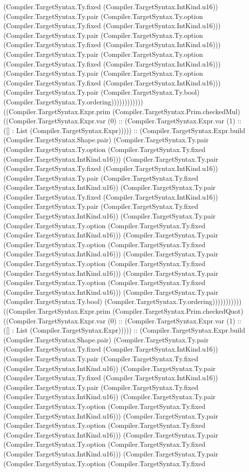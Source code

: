 \documentclass[11pt]{article}
\begin{document}
(Compiler.TargetSyntax.Ty.fixed (Compiler.TargetSyntax.IntKind.u16)) (Compiler.TargetSyntax.Ty.pair (Compiler.TargetSyntax.Ty.option (Compiler.TargetSyntax.Ty.fixed (Compiler.TargetSyntax.IntKind.u16))) (Compiler.TargetSyntax.Ty.pair (Compiler.TargetSyntax.Ty.option (Compiler.TargetSyntax.Ty.fixed (Compiler.TargetSyntax.IntKind.u16))) (Compiler.TargetSyntax.Ty.pair (Compiler.TargetSyntax.Ty.option (Compiler.TargetSyntax.Ty.fixed (Compiler.TargetSyntax.IntKind.u16))) (Compiler.TargetSyntax.Ty.pair (Compiler.TargetSyntax.Ty.option (Compiler.TargetSyntax.Ty.fixed (Compiler.TargetSyntax.IntKind.u16))) (Compiler.TargetSyntax.Ty.pair (Compiler.TargetSyntax.Ty.bool) (Compiler.TargetSyntax.Ty.ordering)))))))))))) ((Compiler.TargetSyntax.Expr.prim (Compiler.TargetSyntax.Prim.checkedMul) ((Compiler.TargetSyntax.Expr.var (0) :: (Compiler.TargetSyntax.Expr.var (1) :: ([] : List (Compiler.TargetSyntax.Expr))))) :: (Compiler.TargetSyntax.Expr.build (Compiler.TargetSyntax.Shape.pair) (Compiler.TargetSyntax.Ty.pair (Compiler.TargetSyntax.Ty.option (Compiler.TargetSyntax.Ty.fixed (Compiler.TargetSyntax.IntKind.u16))) (Compiler.TargetSyntax.Ty.pair (Compiler.TargetSyntax.Ty.fixed (Compiler.TargetSyntax.IntKind.u16)) (Compiler.TargetSyntax.Ty.pair (Compiler.TargetSyntax.Ty.fixed (Compiler.TargetSyntax.IntKind.u16)) (Compiler.TargetSyntax.Ty.pair (Compiler.TargetSyntax.Ty.fixed (Compiler.TargetSyntax.IntKind.u16)) (Compiler.TargetSyntax.Ty.pair (Compiler.TargetSyntax.Ty.fixed (Compiler.TargetSyntax.IntKind.u16)) (Compiler.TargetSyntax.Ty.pair (Compiler.TargetSyntax.Ty.option (Compiler.TargetSyntax.Ty.fixed (Compiler.TargetSyntax.IntKind.u16))) (Compiler.TargetSyntax.Ty.pair (Compiler.TargetSyntax.Ty.option (Compiler.TargetSyntax.Ty.fixed (Compiler.TargetSyntax.IntKind.u16))) (Compiler.TargetSyntax.Ty.pair (Compiler.TargetSyntax.Ty.option (Compiler.TargetSyntax.Ty.fixed (Compiler.TargetSyntax.IntKind.u16))) (Compiler.TargetSyntax.Ty.pair (Compiler.TargetSyntax.Ty.option (Compiler.TargetSyntax.Ty.fixed (Compiler.TargetSyntax.IntKind.u16))) (Compiler.TargetSyntax.Ty.pair (Compiler.TargetSyntax.Ty.bool) (Compiler.TargetSyntax.Ty.ordering))))))))))) ((Compiler.TargetSyntax.Expr.prim (Compiler.TargetSyntax.Prim.checkedQuot) ((Compiler.TargetSyntax.Expr.var (0) :: (Compiler.TargetSyntax.Expr.var (1) :: ([] : List (Compiler.TargetSyntax.Expr))))) :: (Compiler.TargetSyntax.Expr.build (Compiler.TargetSyntax.Shape.pair) (Compiler.TargetSyntax.Ty.pair (Compiler.TargetSyntax.Ty.fixed (Compiler.TargetSyntax.IntKind.u16)) (Compiler.TargetSyntax.Ty.pair (Compiler.TargetSyntax.Ty.fixed (Compiler.TargetSyntax.IntKind.u16)) (Compiler.TargetSyntax.Ty.pair (Compiler.TargetSyntax.Ty.fixed (Compiler.TargetSyntax.IntKind.u16)) (Compiler.TargetSyntax.Ty.pair (Compiler.TargetSyntax.Ty.fixed (Compiler.TargetSyntax.IntKind.u16)) (Compiler.TargetSyntax.Ty.pair (Compiler.TargetSyntax.Ty.option (Compiler.TargetSyntax.Ty.fixed (Compiler.TargetSyntax.IntKind.u16))) (Compiler.TargetSyntax.Ty.pair (Compiler.TargetSyntax.Ty.option (Compiler.TargetSyntax.Ty.fixed (Compiler.TargetSyntax.IntKind.u16))) (Compiler.TargetSyntax.Ty.pair (Compiler.TargetSyntax.Ty.option (Compiler.TargetSyntax.Ty.fixed (Compiler.TargetSyntax.IntKind.u16))) (Compiler.TargetSyntax.Ty.pair (Compiler.TargetSyntax.Ty.option (Compiler.TargetSyntax.Ty.fixed 
\end{document}
